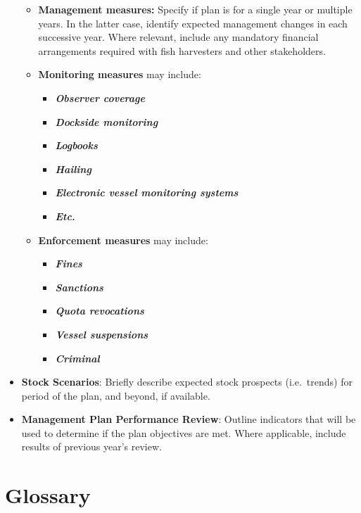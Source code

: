 \documentclass[]{book}
\begin{document}
\begin{itemize}
  \begin{itemize}
  \item
    \textbf{Management measures:} Specify if plan is for a single year
    or multiple years. In the latter case, identify expected management
    changes in each successive year. Where relevant, include any
    mandatory financial arrangements required with fish harvesters and
    other stakeholders.
  \item
    \textbf{Monitoring measures} may include:

    \begin{itemize}
    \item
      \textbf{\emph{Observer coverage }}
    \item
      \textbf{\emph{Dockside monitoring}}
    \item
      \textbf{\emph{Logbooks }}
    \item
      \textbf{\emph{Hailing}}
    \item
      \textbf{\emph{Electronic vessel monitoring systems}}
    \item
      \textbf{\emph{Etc.}}
    \end{itemize}
  \item
    \textbf{Enforcement measures} may include:

    \begin{itemize}
    \item
      \textbf{\emph{Fines}}
    \item
      \textbf{\emph{Sanctions}}
    \item
      \textbf{\emph{Quota revocations}}
    \item
      \textbf{\emph{Vessel suspensions}}
    \item
      \textbf{\emph{Criminal }}
    \end{itemize}
  \end{itemize}
\item
  \textbf{Stock Scenarios}: Briefly describe expected stock prospects
  (i.e.~trends) for period of the plan, and beyond, if available.
\item
  \textbf{Management Plan Performance Review}: Outline indicators that
  will be used to determine if the plan objectives are met. Where
  applicable, include results of previous year's review.
\end{itemize}

\hypertarget{Glossary}{\chapter{Glossary}\label{Glossary}}
\end{document}
